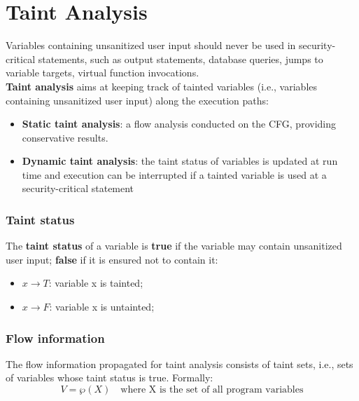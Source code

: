 \documentclass[a4paper, 10pt, titlepage]{article}
\begin{document}
\newpage
\section{Taint Analysis}
Variables containing unsanitized user input should never be used in security-critical statements, such as output statements, database queries, jumps to variable targets, virtual function invocations. \medskip \\
\textbf{Taint analysis} aims at keeping track of tainted variables (i.e., variables containing unsanitized user input) along the execution paths: 
\begin{itemize}
\item \textbf{Static taint analysis}: a flow analysis conducted on the CFG, providing conservative results.
\item \textbf{Dynamic taint analysis}: the taint status of variables is updated at run time and execution can be interrupted if a tainted variable is used at a security-critical statement
\end{itemize}  
\subsubsection*{Taint status}
The \textbf{taint status} of a variable is \textbf{true} if the variable may contain unsanitized user input; \textbf{false} if it is ensured not to contain it:
\begin{itemize}
\item $x \rightarrow T$: variable x is tainted;
\item $x \rightarrow F$: variable x is untainted;
\end{itemize}

\subsubsection*{Flow information}
The flow information propagated for taint analysis consists of taint sets, i.e., sets of variables whose taint status is true. Formally: 
\begin{equation*}
V = \wp(X) \quad \text{where X is the set of all program variables}
\end{equation*}
\end{document}
